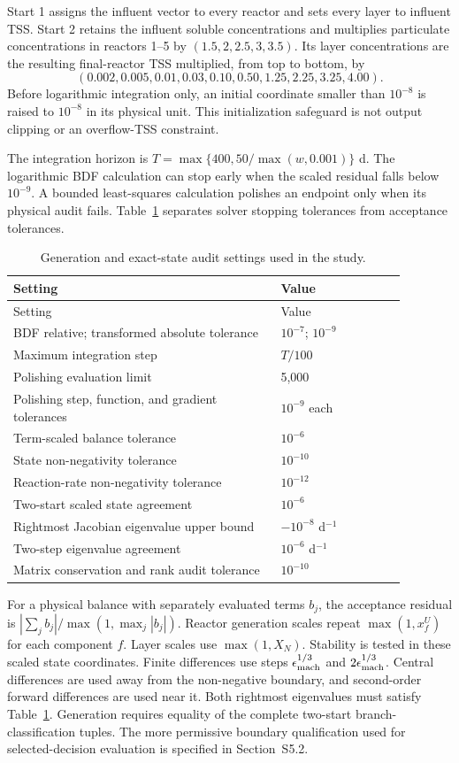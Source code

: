 \documentclass[a4paper,fleqn]{cas-sc}
\begin{document}
Start 1 assigns the influent vector to every reactor and sets every layer to influent TSS. Start 2 retains the influent soluble concentrations and multiplies particulate concentrations in reactors 1--5 by $(1.5,2,2.5,3,3.5)$. Its layer concentrations are the resulting final-reactor TSS multiplied, from top to bottom, by
\[
(0.002,0.005,0.01,0.03,0.10,0.50,1.25,2.25,3.25,4.00).
\]
Before logarithmic integration only, an initial coordinate smaller than $10^{-8}$ is raised to $10^{-8}$ in its physical unit. This initialization safeguard is not output clipping or an overflow-TSS constraint.

The integration horizon is $T=\max\{400,50/\max(w,0.001)\}$ d. The logarithmic BDF calculation can stop early when the scaled residual falls below $10^{-9}$. A bounded least-squares calculation polishes an endpoint only when its physical audit fails. Table~\ref{tab:Sgeneration} separates solver stopping tolerances from acceptance tolerances.

\begin{longtable}{p{0.60\linewidth}p{0.28\linewidth}}
\caption{Generation and exact-state audit settings used in the study.}\label{tab:Sgeneration}\\
\toprule
Setting & Value\\
\midrule
\endfirsthead
\toprule
Setting & Value\\
\midrule
\endhead
BDF relative; transformed absolute tolerance & $10^{-7}$; $10^{-9}$\\
Maximum integration step & $T/100$\\
Polishing evaluation limit & 5,000\\
Polishing step, function, and gradient tolerances & $10^{-9}$ each\\
Term-scaled balance tolerance & $10^{-6}$\\
State non-negativity tolerance & $10^{-10}$\\
Reaction-rate non-negativity tolerance & $10^{-12}$\\
Two-start scaled state agreement & $10^{-6}$\\
Rightmost Jacobian eigenvalue upper bound & $-10^{-8}$ d$^{-1}$\\
Two-step eigenvalue agreement & $10^{-6}$ d$^{-1}$\\
Matrix conservation and rank audit tolerance & $10^{-10}$\\
\bottomrule
\end{longtable}

For a physical balance with separately evaluated terms $b_j$, the acceptance residual is $|\sum_j b_j|/\max(1,\max_j|b_j|)$. Reactor generation scales repeat $\max(1,x_f^U)$ for each component $f$. Layer scales use $\max(1,X_N)$. Stability is tested in these scaled state coordinates. Finite differences use steps $\epsilon_{\rm mach}^{1/3}$ and $2\epsilon_{\rm mach}^{1/3}$. Central differences are used away from the non-negative boundary, and second-order forward differences are used near it. Both rightmost eigenvalues must satisfy Table~\ref{tab:Sgeneration}. Generation requires equality of the complete two-start branch-classification tuples. The more permissive boundary qualification used for selected-decision evaluation is specified in Section~S5.2.
\end{document}
